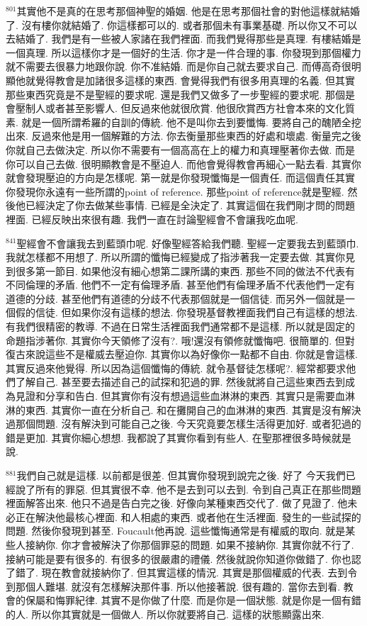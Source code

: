 \documentclass{book}
\begin{document}
$^{801}$其實他不是真的在思考那個神聖的婚姻.
他是在思考那個社會的對他這樣就結婚了.
沒有樓你就結婚了.
你這樣都可以的.
或者那個未有事業基礎.
所以你又不可以去結婚了.
我們是有一些被人家諸在我們裡面.
而我們覺得那些是真理.
有樓結婚是一個真理.
所以這樣你才是一個好的生活.
你才是一件合理的事.
你發現到那個權力就不需要去很暴力地跟你說.
你不准結婚.
而是你自己就去要求自己.
而傅高奇很明顯他就覺得教會是加諸很多這樣的東西.
會覺得我們有很多用真理的名義.
但其實那些東西究竟是不是聖經的要求呢.
還是我們又做多了一步聖經的要求呢.
那個是會壓制人或者甚至影響人.
但反過來他就很欣賞.
他很欣賞西方社會本來的文化質素.
就是一個所謂希羅的自訓的傳統.
他不是叫你去到要懺悔.
要將自己的醜陋全挖出來.
反過來他是用一個解難的方法.
你去衡量那些東西的好處和壞處.
衡量完之後你就自己去做決定.
所以你不需要有一個高高在上的權力和真理壓著你去做.
而是你可以自己去做.
很明顯教會是不壓迫人.
而他會覺得教會再細心一點去看.
其實你就會發現壓迫的方向是怎樣呢.
第一就是你發現懺悔是一個責任.
而這個責任其實你發現你永遠有一些所謂的point of reference.
那些point of reference就是聖經.
然後他已經決定了你去做某些事情.
已經是全決定了.
其實這個在我們剛才問的問題裡面.
已經反映出來很有趣.
我們一直在討論聖經會不會讓我吃血呢.

$^{841}$聖經會不會讓我去到藍頭巾呢.
好像聖經答給我們聽.
聖經一定要我去到藍頭巾.
我就怎樣都不用想了.
所以所謂的懺悔已經變成了指涉著我一定要去做.
其實你見到很多第一節目.
如果他沒有細心想第二課所講的東西.
那些不同的做法不代表有不同倫理的矛盾.
他們不一定有倫理矛盾.
甚至他們有倫理矛盾不代表他們一定有道德的分歧.
甚至他們有道德的分歧不代表那個就是一個信徒.
而另外一個就是一個假的信徒.
但如果你沒有這樣的想法.
你發現基督教裡面我們自己有這樣的想法.
有我們很精密的教導.
不過在日常生活裡面我們通常都不是這樣.
所以就是固定的命題指涉著你.
其實你今天領修了沒有?.
哦!還沒有領修就懺悔吧.
很簡單的.
但對復古來說這些不是權威去壓迫你.
其實你以為好像你一點都不自由.
你就是會這樣.
其實反過來他覺得.
所以因為這個懺悔的傳統.
就令基督徒怎樣呢?.
經常都要求他們了解自己.
甚至要去描述自己的試探和犯過的罪.
然後就將自己這些東西去到成為見證和分享和告白.
但其實你有沒有想過這些血淋淋的東西.
其實只是需要血淋淋的東西.
其實你一直在分析自己.
和在攤開自己的血淋淋的東西.
其實是沒有解決過那個問題.
沒有解決到可能自己之後.
今天究竟要怎樣生活得更加好.
或者犯過的錯是更加.
其實你細心想想.
我都說了其實你看到有些人.
在聖那裡很多時候就是說.

$^{881}$我們自己就是這樣.
以前都是很差.
但其實你發現到說完之後.
好了 今天我們已經說了所有的罪惡.
但其實很不幸.
他不是去到可以去到.
令到自己真正在那些問題裡面解答出來.
他只不過是告白完之後.
好像向某種東西交代了.
做了見證了.
他未必正在解決他最核心裡面.
和人相處的東西.
或者他在生活裡面.
發生的一些試探的問題.
然後你發現到甚至.
Foucault他再說.
這些懺悔通常是有權威的取向.
就是某些人接納你.
你才會被解決了你那個罪惡的問題.
如果不接納你.
其實你就不行了.
接納可能是要有很多的.
有很多的很嚴肅的禮儀.
然後就說你知道你做錯了.
你也認了錯了.
現在教會就接納你了.
但其實這樣的情況.
其實是那個權威的代表.
去到令到那個人難堪.
就沒有怎樣解決那件事.
所以他接著說.
很有趣的.
當你去到看.
教會的保屬和悔罪紀律.
其實不是你做了什麼.
而是你是一個狀態.
就是你是一個有錯的人.
所以你其實就是一個做人.
所以你就要將自己.
這樣的狀態顯露出來.
\end{document}
